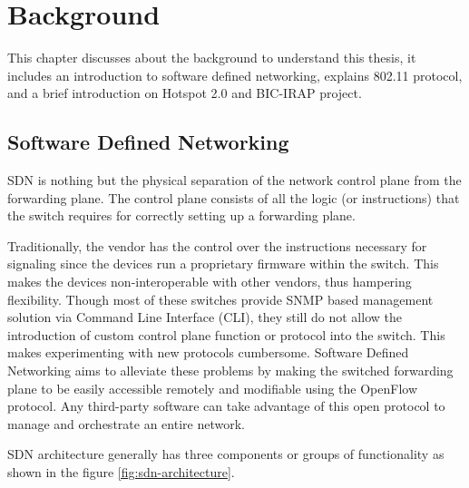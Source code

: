 
\chapter{Background}\label{ch:Background}
\sffamily{}

This chapter discusses about the background to understand this thesis, it includes an introduction to software defined networking, explains 802.11 protocol, and a brief introduction on Hotspot 2.0 and BIC-IRAP project.

\section{Software Defined Networking \cite{SDN}}\label{sec:SDN}

SDN is nothing but the physical separation of the network control plane from the forwarding plane. The control plane consists of all the logic (or instructions) that the switch requires for correctly setting up a forwarding plane.

Traditionally, the vendor has the control over the instructions necessary for signaling since the devices run a proprietary firmware within the switch. This makes the devices non-interoperable with other vendors, thus hampering flexibility. Though most of these switches provide SNMP based management solution via Command Line Interface (CLI), they still do not allow the introduction of custom control plane function or protocol into the switch. This makes experimenting with new protocols cumbersome. Software Defined Networking aims to alleviate these problems by making the switched forwarding plane to be easily accessible remotely and modifiable using the OpenFlow protocol. Any third-party software can take advantage of this open protocol to manage and orchestrate an entire network.

SDN architecture generally has three components or groups of functionality as shown in the figure \ref{fig:sdn-architecture}.

